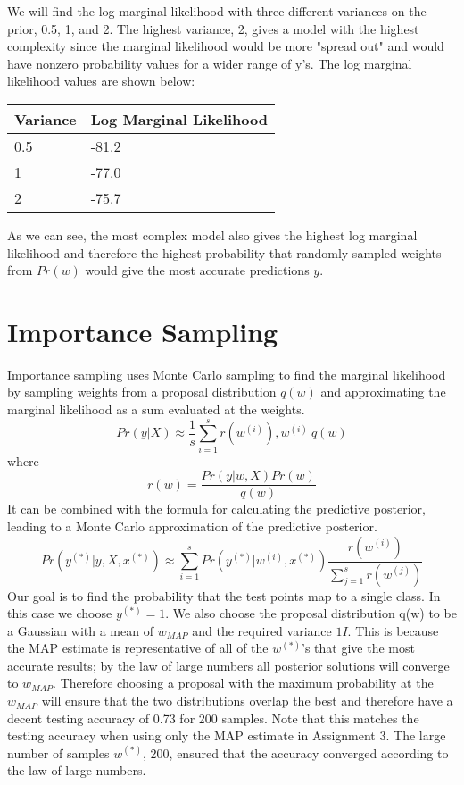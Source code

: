 \documentclass[11pt,letterpaper,titlepage]{article}
\begin{document}
	We will find the log marginal likelihood with three different variances on the prior, 0.5, 1, and 2. The highest variance, 2, gives a model with the highest complexity since the marginal likelihood would be more "spread out" and would have nonzero probability values for a wider range of y's.
	The log marginal likelihood values are shown below:
	
	\begin{tabular}{|l|l|}
		\hline
		Variance & Log Marginal Likelihood \\ \hline
		0.5          & -81.2            \\ \hline
		1         & -77.0            \\ \hline
		2        & -75.7            \\ \hline
	\end{tabular}
	\label{LML}
	
	As we can see, the most complex model also gives the highest log marginal likelihood and therefore the highest probability that randomly sampled weights from $Pr(w)$ would give the most accurate predictions $y$.
	
	\section{Importance Sampling}
	Importance sampling uses Monte Carlo sampling to find the marginal likelihood by sampling weights from a proposal distribution $q(w)$ and approximating the marginal likelihood as a sum evaluated at the weights.
	\begin{equation}
		Pr(y|X) \approx \frac{1}{s} \sum_{i=1}^{s} r(w^{(i)}), w^{(i)}~q(w)
	\end{equation}
	where
	\begin{equation}
		r(w) = \frac{Pr(y|w,X)Pr(w)}{q(w)}
	\end{equation}
	It can be combined with the formula for calculating the predictive posterior, leading to a Monte Carlo approximation of the predictive posterior.
	\begin{equation}
		Pr(y^{(*)}|y,X,x^{(*)}) \approx \sum_{i=1}^{s} Pr(y^{(*)}|w^{(i)},x^{(*)}) \frac{r(w^{(i)})}{\sum_{j=1}^{s} r(w^{(j)})}
	\end{equation}
	Our goal is to find the probability that the test points map to a single class. In this case we choose $y^{(*)}=1$.
	We also choose the proposal distribution q(w) to be a Gaussian with a mean of $w_{MAP}$ and the required variance $1I$. This is because the MAP estimate is representative of all of the $w^{(*)}$'s that give the most accurate results; by the law of large numbers all posterior solutions will converge to $w_{MAP}$. Therefore choosing a proposal with the maximum probability at the $w_{MAP}$ will ensure that the two distributions overlap the best and therefore have a decent testing accuracy of 0.73 for 200 samples. Note that this matches the testing accuracy when using only the MAP estimate in Assignment 3. The large number of samples $w^{(*)}$, 200, ensured that the accuracy converged according to the law of large numbers.
	
\end{document}
